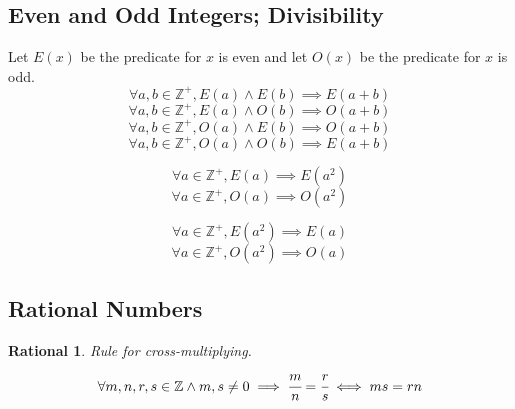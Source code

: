 \subsection{Even and Odd Integers; Divisibility}
\begin{theorem}
Let $E(x)$ be the predicate for $x$ is even and let $O(x)$ be the predicate for $x$ is odd.
\[
\forall a, b \in \mathbb{Z}^+, E(a) \land E(b) \implies E(a + b)
\]
\[
\forall a, b \in \mathbb{Z}^+, E(a) \land O(b) \implies O(a + b)
\]
\[
\forall a, b \in \mathbb{Z}^+, O(a) \land E(b) \implies O(a + b)
\]
\[
\forall a, b \in \mathbb{Z}^+, O(a) \land O(b) \implies E(a + b)
\]
\end{theorem}
\begin{theorem}
\[
\forall a \in \mathbb{Z}^+, E(a) \implies E(a^2)
\]
\[
\forall a \in \mathbb{Z}^+, O(a) \implies O(a^2)
\]
\end{theorem}
\begin{corollary}
\[
\forall a \in \mathbb{Z}^+, E(a^2) \implies E(a)
\]
\[
\forall a \in \mathbb{Z}^+, O(a^2) \implies O(a)
\]
\end{corollary}
\subsection{Rational Numbers}
\newtheorem{rational}{Rational}[section]
\begin{rational}
Rule for cross-multiplying.
\[
\forall m, n, r, s \in \mathbb{Z} \land m, s \neq 0 \implies \cfrac{m}{n} = \cfrac{r}{s} \iff ms = rn
\]
\end{rational}
